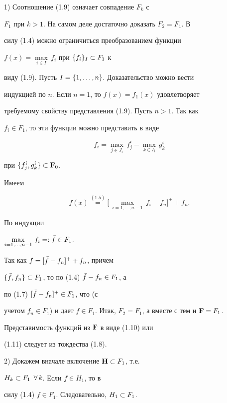 \begin{pf} 1) Соотношение (1.9) означает совпадение $F_k$ с


$F_1$ при $k>1$. На самом деле достаточно доказать $F_2=F_1$. В


силу (1.4) можно ограничиться преобразованием функции


$f(x)=\max\limits_{i\in I}\, f_i$ при $\{f_i\}_I \subset F_1$ к


виду (1.9). Пусть $I=\{1,\dotsc,n\}$. Доказательство можно вести


индукцией по $n$. Если $n=1$, то $f(x)=f_1(x)$ удовлетворяет


требуемому свойству представления (1.9). Пусть $n>1$. Так как


$f_i \in F_1$, то эти функции можно представить в виде


$$


f_i = \max_{j\in J_i}\, f_j^i - \max_{k\in I_i}\,g_k^i


$$


при $\{f_j^i, g_k^i \} \subset \bold F_0$.


Имеем


$$


f(x) \overset{(1.5)}{=}{} \bigl[\, \max_{i=1,\dotsc,n-1}\, f_i -


f_n \bigr]^+ +f_n.


$$


По индукции


$\max\limits_{i=1,\dotsc,n-1}\, f_i =: \Bar{f} \in F_1$.


Так как $f= [\Bar{f} -f_n]^+ +f_n$, причем


$\{\Bar{f}, f_n \} \subset F_1$, то по (1.4) $\Bar{f} -f_n \in F_1$, а


по (1.7) $[ \Bar{f} -f_n ]^+ \in F_1$, что (с


учетом $f_n \in F_1$) и дает $f\in F_1$. Итак, $F_2 =


F_1$, а вместе с тем и $\F=F_1$.





Представимость функций из $\bold F$ в виде (1.10) или


(1.11) следует из тождества (1.8).


\medskip





2) Докажем вначале включение $\bold H \subset F_1$, т.е.


$H_k \subset F_1$ $\forall\,k$. Если $f\in H_1$, то в


силу (1.4) $f\in F_1$. Следовательно, $H_1 \subset F_1$.



\end{pf}

